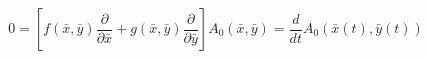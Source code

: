\begin{equation}%
0 = \left[ f(\bar{x}, \bar{y}) \frac{\partial}{\partial \bar{x}} + g
(\bar{x}, \bar{y}) \frac{\partial}{\partial\bar{y}} \right] A_0
(\bar{x}, \bar{y}) = \frac{d}{dt} A_0 \left( \bar{x}(t), \bar{y}(t)
\right)
\end{equation}

